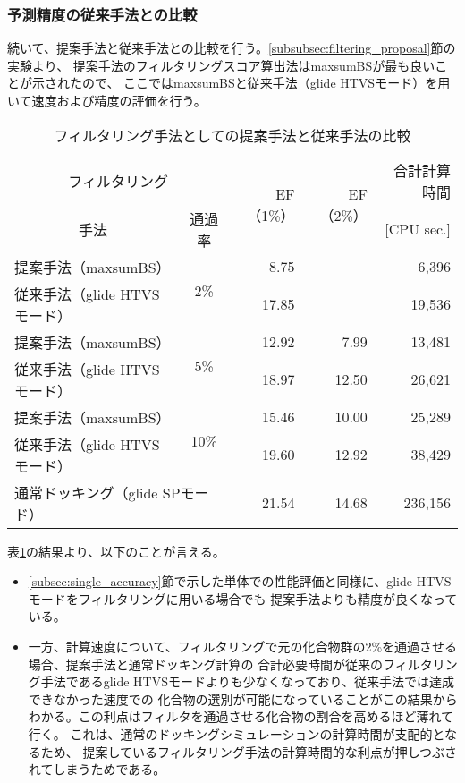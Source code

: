 \subsubsection{予測精度の従来手法との比較}\label{subsubsec:filtering_comparison}
続いて、提案手法と従来手法との比較を行う。\ref{subsubsec:filtering_proposal}節の実験より、
提案手法のフィルタリングスコア算出法はmaxsumBSが最も良いことが示されたので、
ここではmaxsumBSと従来手法（glide HTVSモード）を用いて速度および精度の評価を行う。

\begin{table}[htb] \centering
	\caption{フィルタリング手法としての提案手法と従来手法の比較}
	\label{table:filtering_proposal_glide}
	\begin{tabular}{lc|rr|r}
	\hline
	\multicolumn{2}{c|}{フィルタリング}					&\multirow{2}{*}{EF（1\%）}	&\multirow{2}{*}{EF（2\%）}	&合計計算時間	\\
	\multicolumn{1}{c}{手法}		&通過率				&						&						&[CPU sec.]		\\ \hline
	提案手法（maxsumBS）		&\multirow{2}{*}{2\%}	&8.75					&\textendash				&6,396			\\
	従来手法（glide HTVSモード）	&					&17.85					&\textendash				&19,536			\\
	提案手法（maxsumBS）		&\multirow{2}{*}{5\%}	&12.92					&7.99					&13,481			\\
	従来手法（glide HTVSモード）	&					&18.97					&12.50					&26,621			\\
	提案手法（maxsumBS）		&\multirow{2}{*}{10\%}	&15.46					&10.00					&25,289			\\
	従来手法（glide HTVSモード）	&					&19.60					&12.92					&38,429			\\ \hline
	\multicolumn{2}{l|}{通常ドッキング（glide SPモード）}	&21.54					&14.68					&236,156			\\ \hline
	\end{tabular}
\end{table}

表\ref{table:filtering_proposal_glide}の結果より、以下のことが言える。
\begin{itemize}
\item \ref{subsec:single_accuracy}節で示した単体での性能評価と同様に、glide HTVSモードをフィルタリングに用いる場合でも
	提案手法よりも精度が良くなっている。
\item 一方、計算速度について、フィルタリングで元の化合物群の2\%を通過させる場合、提案手法と通常ドッキング計算の
	合計必要時間が従来のフィルタリング手法であるglide HTVSモードよりも少なくなっており、従来手法では達成できなかった速度での
	化合物の選別が可能になっていることがこの結果からわかる。この利点はフィルタを通過させる化合物の割合を高めるほど薄れて行く。
	これは、通常のドッキングシミュレーションの計算時間が支配的となるため、
	提案しているフィルタリング手法の計算時間的な利点が押しつぶされてしまうためである。
\end{itemize}